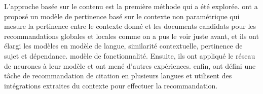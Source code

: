 \par L'approche basée sur le contenu est la première méthode qui a été explorée. ont a proposé un modèle de pertinence basé sur le contexte non paramétrique qui mesure la pertinence entre le contexte donné et les documents candidats pour les recommandations globales et locales comme on a pus le voir juste avant, et ils \cite{ch1ref19} ont élargi les modèles en modèle de langue, similarité contextuelle, pertinence de sujet et dépendance. modèle de fonctionnalité. Ensuite, ils\cite{ch1ref20} ont appliqué le réseau de neurones à leur modèle et ont mené d'autres expériences.  
enfin,  \cite{ch1ref20} ont défini une tâche de recommandation de citation en plusieurs langues et utilisent des intégrations extraites du contexte pour effectuer la recommandation.

%        
%        
%
        
